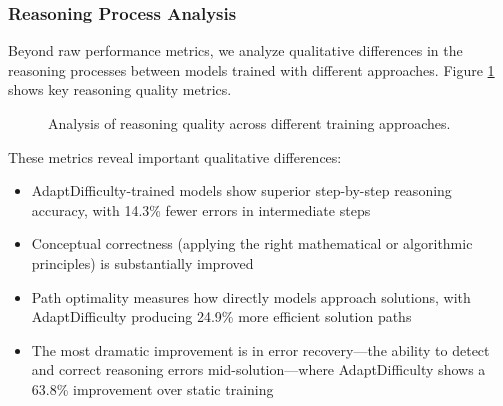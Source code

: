 \subsubsection{Reasoning Process Analysis}

Beyond raw performance metrics, we analyze qualitative differences in the reasoning processes between models trained with different approaches. Figure \ref{fig:reasoning-quality} shows key reasoning quality metrics.

\begin{figure}[H]
    \centering
    \caption{Analysis of reasoning quality across different training approaches.}
    \label{fig:reasoning-quality}
\end{figure}

These metrics reveal important qualitative differences:

\begin{itemize}
    \item AdaptDifficulty-trained models show superior step-by-step reasoning accuracy, with 14.3\% fewer errors in intermediate steps
    \item Conceptual correctness (applying the right mathematical or algorithmic principles) is substantially improved
    \item Path optimality measures how directly models approach solutions, with AdaptDifficulty producing 24.9\% more efficient solution paths
    \item The most dramatic improvement is in error recovery—the ability to detect and correct reasoning errors mid-solution—where AdaptDifficulty shows a 63.8\% improvement over static training
\end{itemize}


